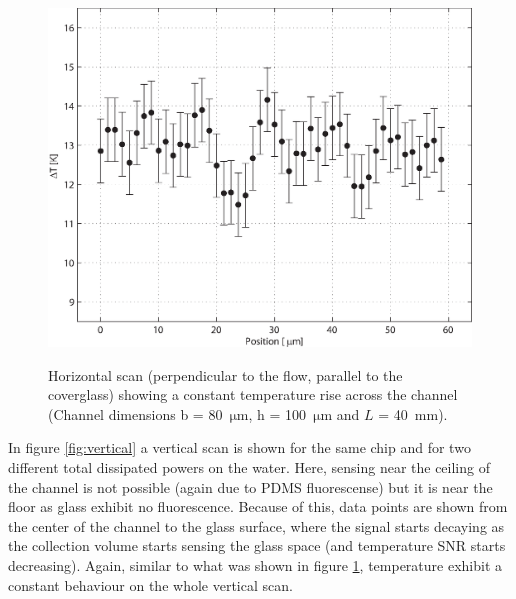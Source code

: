 \documentclass[twocolumn]{svjour3}       %
\begin{document}
\begin{figure}[h!]
\centering
\includegraphics[width=\columnwidth]{figs/horizontal.eps}
\label{fig:horizontal}
\caption{Horizontal scan (perpendicular to the flow, parallel to the coverglass) showing a constant temperature rise across the channel (Channel dimensions  b = 80~$\mathrm{\mu m}$, h = 100~$\mathrm{\mu m}$ and $L$ = 40~mm).}
\end{figure}

In figure \ref{fig:vertical} a vertical scan is shown for the same chip and for two different total dissipated powers on the water. Here, sensing near the ceiling of the channel is not possible (again due to PDMS fluorescense) but it is near the floor as glass exhibit no fluorescence. Because of this, data points are shown from the center of the channel to the glass surface, where the signal starts decaying as the collection volume starts sensing the glass space (and temperature SNR starts decreasing). Again, similar to what was shown in figure \ref{fig:horizontal}, temperature exhibit a constant behaviour on the whole vertical scan.
\end{document}
